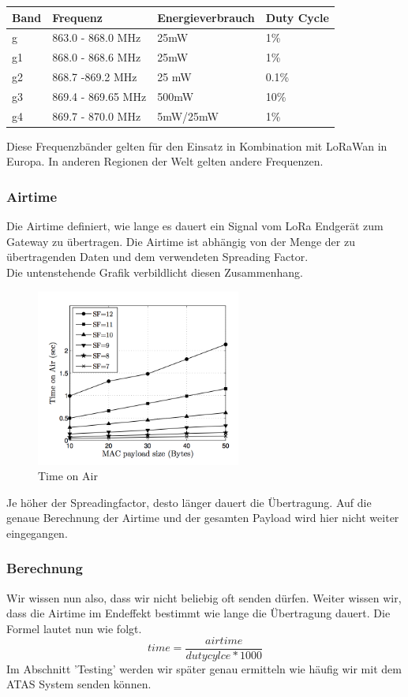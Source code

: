\documentclass[11pt,english,german]{report}
\theoremstyle{definition}
\begin{document}
\begin{tabularx}{\linewidth}{XXXX}
	\textbf{Band} & \textbf{Frequenz} & \textbf{Energieverbrauch} & \textbf{Duty Cycle} \\ \hline
	g &863.0 - 868.0 MHz & 25mW&1\%\\ \hline
	g1 &868.0 - 868.6 MHz & 25mW& 1\%\\ \hline
	g2 &868.7 -869.2 MHz & 25 mW& 0.1\%\\ \hline
	g3 &869.4 - 869.65 MHz & 500mW& 10\%\\ \hline
	g4 &869.7 - 870.0 MHz & 5mW/25mW& 1\%\\ \hline
\end{tabularx} 
\noindent
Diese Frequenzbänder gelten für den Einsatz in Kombination mit LoRaWan in Europa. In anderen Regionen der Welt gelten andere Frequenzen.

\newpage
\subsubsection{Airtime}
Die Airtime definiert, wie lange es dauert ein Signal vom LoRa Endgerät zum Gateway zu übertragen. Die Airtime ist abhängig von der Menge der zu übertragenden Daten und dem verwendeten Spreading Factor.\\[0.3cm]
Die untenstehende Grafik verbildlicht diesen Zusammenhang.
\begin{figure}[H]
	\centering
	\includegraphics[width=0.6\textwidth]{img/lora/timeonair.png}
	\caption[Time on Air]
	{Time on Air}
\end{figure}
\noindent
Je höher der Spreadingfactor, desto länger dauert die Übertragung. Auf die genaue Berechnung der Airtime und der gesamten Payload wird hier nicht weiter eingegangen.

\subsubsection{Berechnung}
Wir wissen nun also, dass wir nicht beliebig oft senden dürfen. Weiter wissen wir, dass die Airtime im Endeffekt bestimmt wie lange die Übertragung dauert. Die Formel lautet nun wie folgt.
\begin{equation*}time = \frac{airtime}{dutycylce * 1000}\end{equation*}
Im Abschnitt 'Testing' werden wir später genau ermitteln wie häufig wir mit dem ATAS System senden können.
\end{document}
